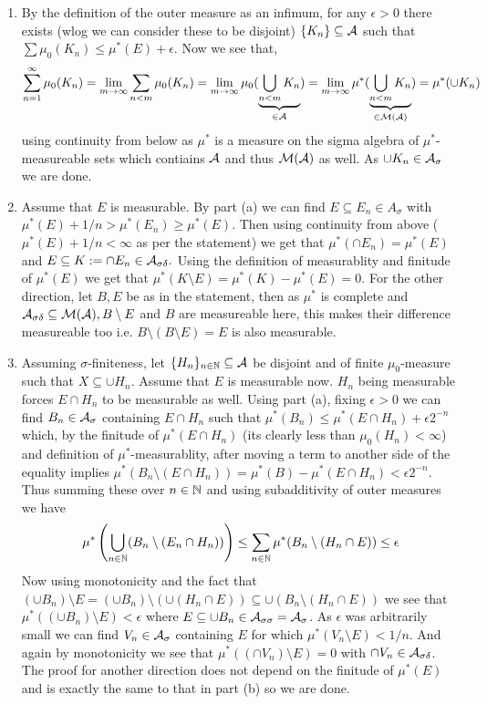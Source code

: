 \documentclass[12pt,a4paper]{article}
\begin{document}
\begin{solution}
    \begin{enumerate}[label=\alph*.]
        \item By the definition of the outer measure as an infimum, for any $\epsilon>0$ there exists (wlog we can consider these to be disjoint) $\{K_n\}\subseteq\mathcal{A}$ such that $\sum\mu_0(K_n)\leq\mu^*(E)+\epsilon$.  
        Now we see that, 
        $$\sum_{n=1}^{\infty}\mu_0(K_n)=\lim_{m\to\infty}\sum_{n<m}\mu_0(K_n)=\lim_{m\to\infty}\mu_0(\underbrace{\bigcup_{n<m}K_n}_{\in\mathcal{A}})=\lim_{m\to\infty}\mu^*(\underbrace{\bigcup_{n<m}K_n}_{\in\mathcal{M}(\mathcal{A})})=\mu^*(\cup K_n)$$
        using continuity from below as $\mu^*$ is a measure on the sigma algebra of $\mu^*$-measureable sets which contiains $\mathcal{A}$ and thus $\mathcal{M}(\mathcal{A})$ as well. As $\cup K_n\in\mathcal{A}_\sigma$ we are done.
        \item Assume that $E$ is measurable. 
        By part (a) we can find $E\subseteq E_n\in A_\sigma$ with $\mu^*(E)+1/n>\mu^*(E_n)\geq\mu^*(E).$ 
        Then using continuity from above ($\mu^*(E)+1/n<\infty$ as per the statement) we get that $\mu^*(\cap E_n)=\mu^*(E)$ and $E\subseteq K:=\cap E_n\in\mathcal{A}_{\sigma\delta}.$ 
        Using the definition of measurablity and finitude of $\mu^*(E)$ we get that $\mu^*(K\setminus E)=\mu^*(K)-\mu^*(E)=0$. 
        For the other direction, let $B,E$ be as in the statement, then as $\mu^*$ is complete and $\mathcal{A}_{\sigma\delta}\subseteq\mathcal{M}(\mathcal{A}),B\setminus E$ and $B$ are measureable here, this makes their difference measureable too i.e. $B\setminus(B\setminus E)=E$ is also measurable. 
        \item Assuming $\sigma$-finiteness, let $\{H_n\}_{n\in\mathbb{N}}\subseteq\mathcal{A}$ be disjoint and of finite $\mu_0$-measure such that $X\subseteq\cup H_n$. 
        Assume that $E$ is measurable now. $H_n$ being measurable forces $E\cap H_n$ to be measurable as well.
        Using part (a), fixing $\epsilon>0$ we can find $B_n\in\mathcal{A}_\sigma$ containing $E\cap H_n$ such that $\mu^*(B_n)\leq\mu^*(E\cap H_n)+\epsilon 2^{-n}$ which, by the finitude of $\mu^*(E\cap H_n)$ (its clearly less than $\mu_0(H_n)<\infty$) and definition of $\mu^*$-measurablity, after moving a term to another side of the equality implies $\mu^*(B_n\setminus (E\cap H_n))=\mu^*(B)-\mu^*(E\cap H_n)<\epsilon2^{-n}$. 
        Thus summing these over $n\in\mathbb{N}$ and using subadditivity of outer measures we have
        $$\mu^*\left(\bigcup_{n\in\mathbb{N}}(B_n\setminus (E_n\cap H_n))\right)\leq\sum_{n\in\mathbb{N}}\mu^*(B_n\setminus(H_n\cap E))\leq\epsilon$$
        Now using monotonicity and the fact that $(\cup B_n)\setminus E=(\cup B_n)\setminus(\cup(H_n\cap E))\subseteq\cup(B_n\setminus(H_n\cap E))$ we see that $\mu^*((\cup B_n)\setminus E)<\epsilon$ where $E\subseteq\cup B_n\in\mathcal{A}_{\sigma\sigma}=\mathcal{A}_\sigma$.
        As $\epsilon$ was arbitrarily small we can find $V_n\in\mathcal{A}_\sigma$ containing $E$ for which $\mu^*(V_n\setminus E)<1/n$.
        And again by monotonicity we see that $\mu^*((\cap V_n)\setminus E)=0$ with $\cap V_n\in\mathcal{A}_{\sigma\delta}$. The proof for another direction does not depend on the finitude of $\mu^*(E)$ and is exactly the same to that in part (b) so we are done. 
    \end{enumerate}
\end{solution}
\end{document}
